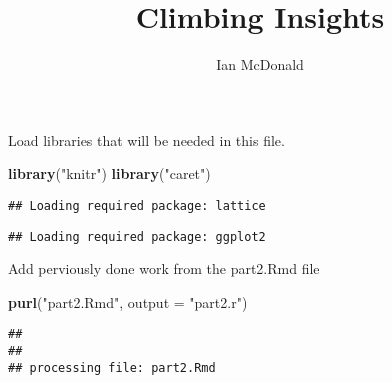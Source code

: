 \documentclass[]{article}
\title{Climbing Insights}
\author{Ian McDonald}
\date{}
\newenvironment{Shaded}{\begin{snugshade}}{\end{snugshade}}
\newcommand{\DataTypeTok}[1]{\textcolor[rgb]{0.13,0.29,0.53}{#1}}
\newcommand{\KeywordTok}[1]{\textcolor[rgb]{0.13,0.29,0.53}{\textbf{#1}}}
\newcommand{\NormalTok}[1]{#1}
\newcommand{\StringTok}[1]{\textcolor[rgb]{0.31,0.60,0.02}{#1}}
\begin{document}
\maketitle

Load libraries that will be needed in this file.

\begin{Shaded}
\begin{Highlighting}[]
\KeywordTok{library}\NormalTok{(}\StringTok{"knitr"}\NormalTok{)}
\KeywordTok{library}\NormalTok{(}\StringTok{"caret"}\NormalTok{)}
\end{Highlighting}
\end{Shaded}

\begin{verbatim}
## Loading required package: lattice
\end{verbatim}

\begin{verbatim}
## Loading required package: ggplot2
\end{verbatim}

Add perviously done work from the part2.Rmd file

\begin{Shaded}
\begin{Highlighting}[]
\KeywordTok{purl}\NormalTok{(}\StringTok{"part2.Rmd"}\NormalTok{, }\DataTypeTok{output =} \StringTok{"part2.r"}\NormalTok{)}
\end{Highlighting}
\end{Shaded}

\begin{verbatim}
## 
## 
## processing file: part2.Rmd
\end{verbatim}
\end{document}
